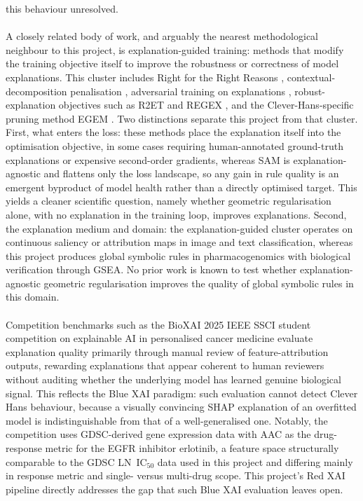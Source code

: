 {this behaviour unresolved.
\\\\
A closely related body of work, and arguably the nearest methodological neighbour to this project,
is explanation-guided training: methods that modify the training objective itself to improve the
robustness or correctness of model explanations. This cluster includes Right for the Right Reasons
\cite{Ross2017}, contextual-decomposition penalisation \cite{Rieger2020}, adversarial training on
explanations \cite{Tang2022}, robust-explanation objectives such as R2ET \cite{Chen2022} and
REGEX \cite{Li2023}, and the Clever-Hans-specific pruning method EGEM \cite{Linhardt2024}. Two distinctions separate this project from that cluster.
First, what enters the loss: these methods place the explanation itself into the optimisation
objective, in some cases requiring human-annotated ground-truth explanations \cite{Ross2017} or
expensive second-order gradients, whereas SAM is explanation-agnostic and flattens only the loss
landscape, so any gain in rule quality is an emergent byproduct of model health rather than a
directly optimised target. This yields a cleaner scientific question, namely whether geometric
regularisation alone, with no explanation in the training loop, improves explanations. Second, the
explanation medium and domain: the explanation-guided cluster operates on continuous saliency or
attribution maps in image and text classification, whereas this project produces global symbolic
rules in pharmacogenomics with biological verification through GSEA. No prior work is known to test
whether explanation-agnostic geometric regularisation improves the quality of global symbolic rules
in this domain.
\\\\
Competition benchmarks such as the BioXAI 2025 IEEE SSCI student competition on explainable AI in
personalised cancer medicine \cite{BioXAI2025} evaluate explanation quality primarily through manual review of
feature-attribution outputs, rewarding explanations that appear coherent to human reviewers without
auditing whether the underlying model has learned genuine biological signal. This reflects the Blue
XAI paradigm: such evaluation cannot detect Clever Hans behaviour, because a visually convincing
SHAP explanation of an overfitted model is indistinguishable from that of a well-generalised one.
Notably, the competition uses GDSC-derived gene expression data with AAC as the drug-response metric
for the EGFR inhibitor erlotinib, a feature space structurally comparable to the GDSC LN~IC$_{50}$
data used in this project and differing mainly in response metric and single- versus multi-drug
scope. This project's Red XAI pipeline directly addresses the gap that such Blue XAI evaluation
leaves open.
}

